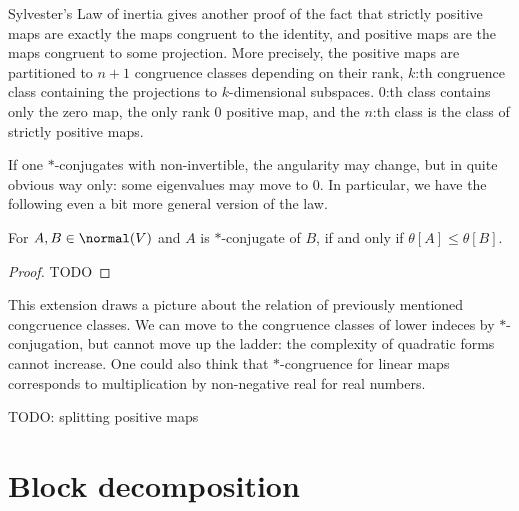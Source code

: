 Sylvester's Law of inertia gives another proof of the fact that strictly positive maps are exactly the maps congruent to the identity, and positive maps are the maps congruent to some projection. More precisely, the positive maps are partitioned to $n + 1$ congruence classes depending on their rank, $k$:th congruence class containing the projections to $k$-dimensional subspaces. $0$:th class contains only the zero map, the only rank $0$ positive map, and the $n$:th class is the class of strictly positive maps.

If one $*$-conjugates with non-invertible, the angularity may change, but in quite obvious way only: some eigenvalues may move to $0$. In particular, we have the following even a bit more general version of the law.

\begin{lause}
	For $A, B \in \normal(V)$ and $A$ is $*$-conjugate of $B$, if and only if $\theta[A] \leq \theta[B]$.
\end{lause}
\begin{proof}
	TODO
\end{proof}

This extension draws a picture about the relation of previously mentioned congcruence classes. We can move to the congruence classes of lower indeces by $*$-conjugation, but cannot move up the ladder: the complexity of quadratic forms cannot increase. One could also think that $*$-congruence for linear maps corresponds to multiplication by non-negative real for real numbers.

TODO: splitting positive maps

\section{Block decomposition}

